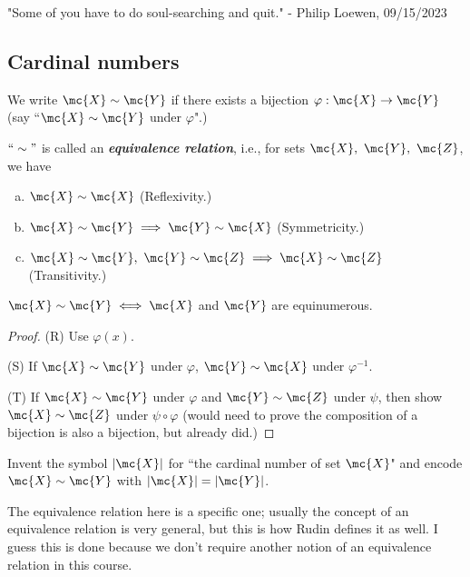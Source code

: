 \begin{nquote}{}
	"Some of you have to do soul-searching and quit." - Philip Loewen, 09/15/2023
\end{nquote}

\subsection{Cardinal numbers}
\begin{ndef}{}
	We write \(\mc{X}\sim \mc{Y}\) if there exists a bijection \(\varphi:\mc{X}\to\mc{Y}\) (say ``\(\mc{X}\sim\mc{Y}\) under \(\varphi\)".)
\end{ndef}
\begin{nproposition}{}
	\(``\sim"\) is called an \emph{\textbf{equivalence relation}}, i.e., for sets \(\mc{X},~\mc{Y},~\mc{Z}\), we have
	\begin{enumerate}[(a)]
		\item \(\mc{X}\sim \mc{X}\) (Reflexivity.)
		
		\item \(\mc{X}\sim \mc{Y}\implies\mc{Y}\sim\mc{X}\) (Symmetricity.)
		
		\item \(\mc{X}\sim\mc{Y},~\mc{Y}\sim\mc{Z}\implies \mc{X}\sim\mc{Z}\) (Transitivity.)
	\end{enumerate}
	\begin{notation}
		\(\mc{X}\sim\mc{Y}\iff\mc{X}\) and \(\mc{Y}\) are equinumerous.
	\end{notation}
\end{nproposition}
\begin{proof}
	(R) Use \(\varphi(x)\). 
	
	\medskip
	
	(S) If \(\mc{X}\sim\mc{Y}\) under \(\varphi\), \(\mc{Y}\sim\mc{X}\) under \(\varphi^{-1}\). 
	
	\medskip
	
	(T) If \(\mc{X}\sim\mc{Y}\) under \(\varphi\) and \(\mc{Y}\sim \mc{Z}\) under \(\psi\), then show \(\mc{X}\sim\mc{Z}\) under \(\psi\circ\varphi\) (would need to prove the composition of a bijection is also a bijection, but already did.)
\end{proof}
Invent the symbol \(|\mc{X}|\) for ``the cardinal number of set \(\mc{X}\)" and encode \(\mc{X}\sim \mc{Y}\) with \(|\mc{X}|=|\mc{Y}|\). 
\begin{note}
	The equivalence relation here is a specific one; usually the concept of an equivalence relation is very general, but this is how Rudin defines it as well. I guess this is done because we don't require another notion of an equivalence relation in this course.
\end{note}
